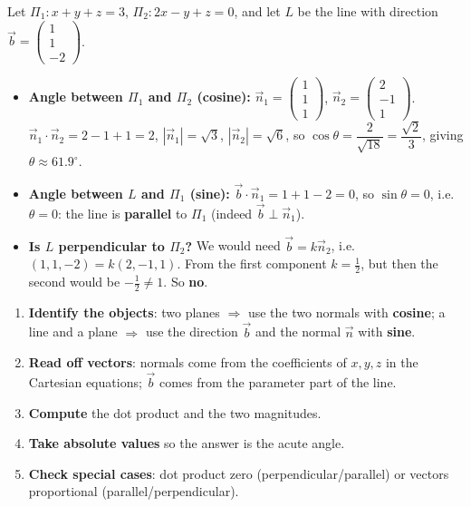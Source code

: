\documentclass[11pt]{article}
\begin{document}
\begin{exemplebox}
Let $\Pi_1: x+y+z=3$, $\Pi_2: 2x-y+z=0$, and let $L$ be the line with direction $\vec{b}=\begin{pmatrix}1\\1\\-2\end{pmatrix}$.
\begin{itemize}
\item \textbf{Angle between $\Pi_1$ and $\Pi_2$ (cosine):}
$\vec{n}_1=\begin{pmatrix}1\\1\\1\end{pmatrix}$, $\vec{n}_2=\begin{pmatrix}2\\-1\\1\end{pmatrix}$.
$\vec{n}_1\cdot\vec{n}_2=2-1+1=2$, $|\vec{n}_1|=\sqrt{3}$, $|\vec{n}_2|=\sqrt{6}$, so
$\cos\theta=\dfrac{2}{\sqrt{18}}=\dfrac{\sqrt{2}}{3}$, giving $\theta\approx 61.9^\circ$.
\item \textbf{Angle between $L$ and $\Pi_1$ (sine):}
$\vec{b}\cdot\vec{n}_1=1+1-2=0$, so $\sin\theta=0$, i.e.\ $\theta=0$: the line is \textbf{parallel} to $\Pi_1$ (indeed $\vec{b}\perp\vec{n}_1$).
\item \textbf{Is $L$ perpendicular to $\Pi_2$?} We would need $\vec{b}=k\vec{n}_2$, i.e.\ $(1,1,-2)=k(2,-1,1)$. From the first component $k=\tfrac12$, but then the second would be $-\tfrac12\ne 1$. So \textbf{no}.
\end{itemize}
\end{exemplebox}

\begin{methode}
\begin{enumerate}
\item \textbf{Identify the objects}: two planes $\Rightarrow$ use the two normals with \textbf{cosine}; a line and a plane $\Rightarrow$ use the direction $\vec{b}$ and the normal $\vec{n}$ with \textbf{sine}.
\item \textbf{Read off vectors}: normals come from the coefficients of $x,y,z$ in the Cartesian equations; $\vec{b}$ comes from the parameter part of the line.
\item \textbf{Compute} the dot product and the two magnitudes.
\item \textbf{Take absolute values} so the answer is the acute angle.
\item \textbf{Check special cases}: dot product zero (perpendicular/parallel) or vectors proportional (parallel/perpendicular).
\end{enumerate}
\end{methode}
\end{document}
